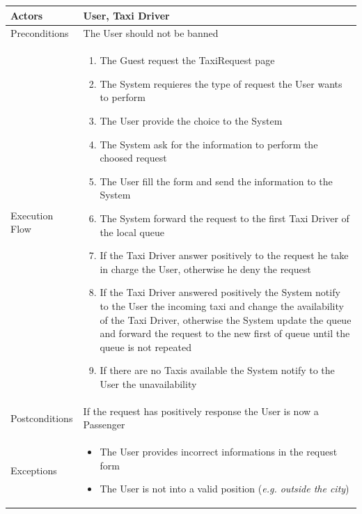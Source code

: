 \documentclass[english]{article}
\begin{document}
\begin{tabular}{lp{8cm}}
\hline
Actors & User, Taxi Driver \\
\hline
Preconditions & The User should not be banned \\
\hline
Execution Flow &  
		\begin{enumerate}
			\item The Guest request the TaxiRequest page
			\item The System requieres the type of request the User wants to perform
			\item The User provide the choice to the System
			\item The System ask for the information to perform the choosed request
			\item The User fill the form and send the information to the System
			\item The System forward the request to the first Taxi Driver of the local queue
			\item If the Taxi Driver answer positively to the request he take in charge the User, otherwise he deny the request
			\item If the Taxi Driver answered positively the System notify to the User the incoming taxi and change the availability of the Taxi Driver, otherwise the System update the queue and forward the request to the new first of queue until the queue is not repeated
			\item If there are no Taxis available the System notify to the User the unavailability
		\end{enumerate} 
	\\ 
\hline
Postconditions & If the request has positively response the User is now a Passenger \\
\hline
Exceptions & 
	\begin{itemize} 
		\item The User provides incorrect informations in the request form
		\item The User is not into a valid position (\emph{e.g. outside the city})
	\end{itemize}
\end{tabular}
\end{document}
